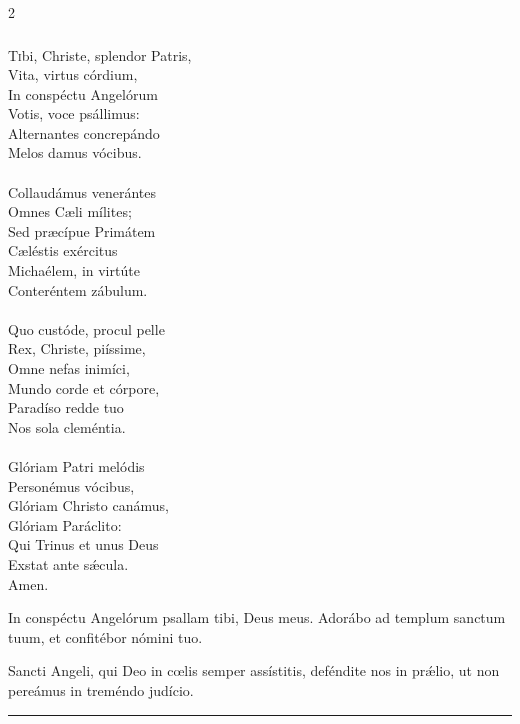 \documentclass[9pt,twoside]{extarticle}
\begin{document}
\begin{multicols}{2}
\subsubsection*{\center {}}
\lettrine{T}ibi, Christe, splendor Patris,\\
Vita, virtus córdium,\\
In conspéctu Angelórum\\
Votis, voce psállimus:\\
Alternantes concrepándo\\
Melos damus vócibus.\\
\\
Collaudámus venerántes\\
Omnes Cæli mílites;\\
Sed præcípue Primátem\\
Cæléstis exércitus\\
Michaélem, in virtúte\\
Conteréntem zábulum.\\
\\
Quo custóde, procul pelle\\
Rex, Christe, piíssime,\\
Omne nefas inimíci,\\
Mundo corde et córpore,\\
Paradíso redde tuo\\
Nos sola cleméntia.\\
\\
Glóriam Patri melódis\\
Personémus vócibus,\\
Glóriam Christo canámus,\\
Glóriam Paráclito:\\
Qui Trinus et unus Deus\\
Exstat ante sǽcula.\\
Amen.

\begin{tightlist}{}
\item {} In conspéctu Angelórum psallam tibi, Deus meus.  Adorábo ad templum sanctum tuum, et confitébor nómini tuo.
\item {} Sancti Angeli, qui Deo in cœlis semper assístitis, deféndite nos in prǽlio, ut non pereámus in treméndo judício.
\end{tightlist}

\begin{center}\textcolor{red}{\rule{\linewidth}{0.5pt}} \end{center}


\end{multicols}
\end{document}
